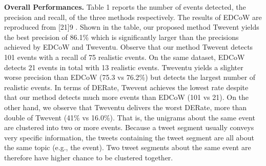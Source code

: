 \documentclass{article}
\begin{document}
\textbf{Overall Performances.}
Table 1 reports the number of events
detected, the precision and recall, of the three methods respectively.
The results of EDCoW are reproduced from [21]9
. Shown in the
table, our proposed method Twevent yields the best precision of
86.1\% which is significantly larger than the precisions achieved
by EDCoW and Tweventu. Observe that our method Twevent detects
101 events with a recall of 75 realistic events. On the same
dataset, EDCoW detects 21 events in total with 13 realistic events.
Tweventu yields a slighter worse precision than EDCoW (75.3%
vs 76.2\%) but detects the largest number of realistic events. In
terms of DERate, Twevent achieves the lowest rate despite that our
method detects much more events than EDCoW (101 vs 21). On
the other hand, we observe that Tweventu delivers the worst DERate,
more than double of Twevent (41\% vs 16.0\%). That is, the unigrams
about the same event are clustered into two or more events.
Because a tweet segment usually conveys very specific information,
the tweets containing the tweet segment are all about the same
topic (e.g., the event). Two tweet segments about the same event
are therefore have higher chance to be clustered together.

\end{document}
